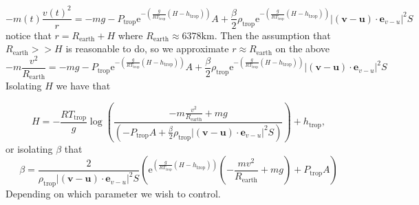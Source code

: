 \documentclass{article}
\renewcommand{\vec}[1]{\boldsymbol{#1}}
\begin{document}
\begin{equation}
     -m(t)\frac{v(t)^2}{r}=-mg-  P_{\text{trop}}\mathrm{e}^{-\left( \frac{g}{RT_{\text{trop}}}(H-h_{\text{trop}}) \right)}A +\frac{\beta }{2} \rho_{\text{trop}}\mathrm{e}^{-\left( \frac{g}{RT_{\text{trop}}}(H-h_{\text{trop}}) \right)} |(\vec{v}-\vec{u})\cdot \vec e_{v-u}|^2S
   \end{equation}
notice that $r=R_{\text{earth}}+H$ where $R_{\text{earth}}\approx 6378\text{km}$. Then the assumption that $R_{\text{earth}}>> H$ is reasonable to do, so we approximate $r\approx R_{\text{earth}}$ on the above 
\begin{equation}
    -m\frac{v^2}{R_{\text{earth}}}= -mg-  P_{\text{trop}}\mathrm{e}^{-\left( \frac{g}{RT_{\text{trop}}}(H-h_{\text{trop}}) \right)}A +\frac{\beta }{2} \rho_{\text{trop}}\mathrm{e}^{-\left( \frac{g}{RT_{\text{trop}}}(H-h_{\text{trop}}) \right)} |(\vec{v}-\vec{u})\cdot \vec e_{v-u}|^2S
\end{equation}
Isolating $H$  we have that


\begin{equation}
    H= - \frac{RT_{\text{trop}}}{g}\log \left(\frac{-m\frac{v^2}{R_{\text{earth}}} +mg}{\left(-  P_{\text{trop}}A +\frac{\beta }{2} \rho_{\text{trop}} |(\vec{v}-\vec{u})\cdot \vec e_{v-u}|^2S\right)}\right)+h_{\text{trop}},
\end{equation}
or isolating $\beta$ that
\begin{equation}
\beta=    \frac{2}{\rho_{\text{trop}}|(\vec{v}-\vec{u})\cdot \vec e_{v-u}|^2S} \left( \mathrm{e}^{\left( \frac{g}{RT_{\text{trop}}}(H-h_{\text{trop}}) \right)} \left( -\frac{m v^2}{R_{\text{earth}}}+mg\right) + P_{\text{trop}}A  \right)
\end{equation}
Depending on which parameter we wish to control. 
\end{document}
